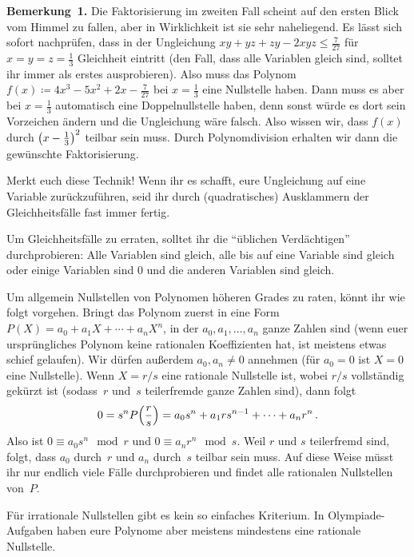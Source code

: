 \textbf{Bemerkung~1.} Die Faktorisierung im zweiten Fall scheint auf den ersten Blick vom Himmel zu fallen, aber in Wirklichkeit ist sie sehr naheliegend. Es lässt sich sofort nachprüfen, dass in der Ungleichung $xy+yz+zy-2xyz\leqslant\frac7{27}$ für $x=y=z=\frac13$ Gleichheit eintritt (den Fall, dass alle Variablen gleich sind, solltet ihr immer als erstes ausprobieren). Also muss das Polynom $f(x)\coloneqq4x^3-5x^2+2x-\frac{7}{27}$ bei $x=\frac13$ eine Nullstelle haben. Dann muss es aber bei $x=\frac13$ automatisch eine Doppelnullstelle haben, denn sonst würde es dort sein Vorzeichen ändern und die Ungleichung wäre falsch. Also wissen wir, dass $f(x)$ durch $\parens[\big]{x-\frac13}^2$ teilbar sein muss. Durch Polynomdivision erhalten wir dann die gewünschte Faktorisierung. 

Merkt euch diese Technik! Wenn ihr es schafft, eure Ungleichung auf eine Variable zurückzuführen, seid ihr durch (quadratisches) Ausklammern der Gleichheitsfälle fast immer fertig.

Um Gleichheitsfälle zu erraten, solltet ihr die \enquote{üblichen Verdächtigen} durchprobieren: Alle Variablen sind gleich, alle bis auf eine Variable sind gleich oder einige Variablen sind $0$ und die anderen Variablen sind gleich.

Um allgemein Nullstellen von Polynomen höheren Grades zu raten, könnt ihr wie folgt vorgehen. Bringt das Polynom zuerst in eine Form $P(X)=a_0+a_1X+\dotsb+a_nX^n$, in der $a_0,a_1,\dotsc,a_n$ ganze Zahlen sind (wenn euer ursprüngliches Polynom keine rationalen Koeffizienten hat, ist meistens etwas schief gelaufen). Wir dürfen außerdem $a_0,a_n\neq 0$ annehmen (für $a_0=0$ ist $X=0$ eine Nullstelle). Wenn $X=r/s$ eine rationale Nullstelle ist, wobei $r/s$ vollständig gekürzt ist (sodass~$r$ und~$s$ teilerfremde ganze Zahlen sind), dann folgt
\begin{equation*}
	0=s^nP\parens*{\frac rs}=a_0s^n+a_1rs^{n-1}+\dotsb+a_nr^n\,.
\end{equation*}
Also ist $0\equiv a_0s^n\mod r$ und $0\equiv a_nr^n\mod s$. Weil $r$ und $s$ teilerfremd sind, folgt, dass $a_0$ durch~$r$ und $a_n$ durch~$s$ teilbar sein muss. Auf diese Weise müsst ihr nur endlich viele Fälle durchprobieren und findet alle rationalen Nullstellen von~$P$.

Für irrationale Nullstellen gibt es kein so einfaches Kriterium. In Olympiade-Aufgaben haben eure Polynome aber meistens mindestens eine rationale Nullstelle.

